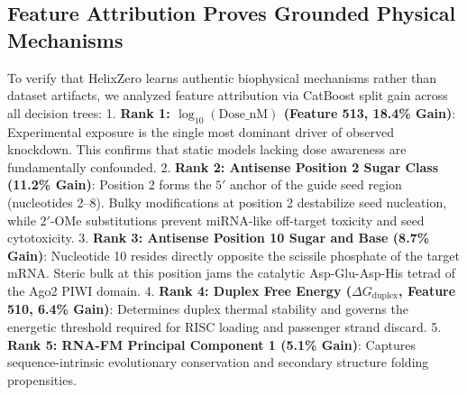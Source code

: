 \documentclass[twocolumn]{article}
\begin{document}
\subsection{Feature Attribution Proves Grounded Physical Mechanisms}
To verify that HelixZero learns authentic biophysical mechanisms rather than dataset artifacts, we analyzed feature attribution via CatBoost split gain across all decision trees:
1. \textbf{Rank 1: $\log_{10}(\text{Dose\_nM})$ (Feature 513, 18.4\% Gain)}: Experimental exposure is the single most dominant driver of observed knockdown. This confirms that static models lacking dose awareness are fundamentally confounded.
2. \textbf{Rank 2: Antisense Position 2 Sugar Class (11.2\% Gain)}: Position 2 forms the $5'$ anchor of the guide seed region (nucleotides 2--8). Bulky modifications at position 2 destabilize seed nucleation, while $2'$-OMe substitutions prevent miRNA-like off-target toxicity and seed cytotoxicity.
3. \textbf{Rank 3: Antisense Position 10 Sugar and Base (8.7\% Gain)}: Nucleotide 10 resides directly opposite the scissile phosphate of the target mRNA. Steric bulk at this position jams the catalytic Asp-Glu-Asp-His tetrad of the Ago2 PIWI domain.
4. \textbf{Rank 4: Duplex Free Energy ($\Delta G_{\text{duplex}}$, Feature 510, 6.4\% Gain)}: Determines duplex thermal stability and governs the energetic threshold required for RISC loading and passenger strand discard.
5. \textbf{Rank 5: RNA-FM Principal Component 1 (5.1\% Gain)}: Captures sequence-intrinsic evolutionary conservation and secondary structure folding propensities.
\end{document}
